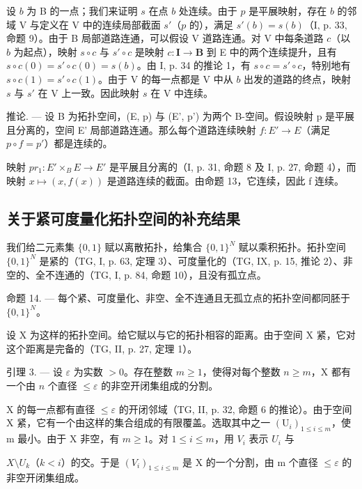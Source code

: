 设 \(b\) 为 B 的一点；我们来证明 \(s\) 在点 \(b\) 处连续。由于 \(p\) 是平展映射，存在 \(b\) 的邻域 V 与定义在 V 中的连续局部截面 \(s'\)（\(p\) 的），满足 \(s'(b) = s(b)\)（I, p. 33, 命题 9）。由于 B 局部道路连通，可以假设 V 道路连通。对 V 中每条道路 \(c\)（以 \(b\) 为起点），映射 \(s \circ c\) 与 \(s' \circ c\) 是映射 \(c \colon \mathbf{I} \to \mathbf{B}\) 到 E 中的两个连续提升，且有 \(s \circ c(0) = s' \circ c(0) = s(b)\)。由 I, p. 34 的推论 1，有 \(s \circ c = s' \circ c\)，特别地有 \(s \circ c(1) = s' \circ c(1)\)。由于 V 的每一点都是 V 中从 \(b\) 出发的道路的终点，映射 \(s\) 与 \(s'\) 在 V 上一致。因此映射 \(s\) 在 V 中连续。

推论. --- 设 B 为拓扑空间，(E, p) 与 (E', p') 为两个 B-空间。假设映射 p 是平展且分离的，空间 E' 局部道路连通。那么每个道路连续映射 \(f: E' \to E\)（满足 \(p \circ f = p'\)）都是连续的。

映射 \(pr_{1}: E'\times_{B} E \rightarrow E'\) 是平展且分离的（I, p. 31, 命题 8 及 I, p. 27, 命题 4），而映射 \(x \mapsto (x, f(x))\) 是道路连续的截面。由命题 13，它连续，因此 f 连续。

\subsection{关于紧可度量化拓扑空间的补充结果}

我们给二元素集 \(\{0,1\}\) 赋以离散拓扑，给集合 \(\{0,1\}^{N}\) 赋以乘积拓扑。拓扑空间 \(\{0,1\}^{N}\) 是紧的（TG, I, p. 63, 定理 3）、可度量化的（TG, IX, p. 15, 推论 2）、非空的、全不连通的（TG, I, p. 84, 命题 10），且没有孤立点。

命题 14. --- 每个紧、可度量化、非空、全不连通且无孤立点的拓扑空间都同胚于 \(\{0,1\}^{N}\)。

设 X 为这样的拓扑空间。给它赋以与它的拓扑相容的距离。由于空间 X 紧，它对这个距离是完备的（TG, II, p. 27, 定理 1）。

引理 3. --- 设 \(\varepsilon\) 为实数 \(>0\)。存在整数 \(m \geqslant 1\)，使得对每个整数 \(n \geqslant m\)，X 都有一个由 \(n\) 个直径 \(\leqslant \varepsilon\) 的非空开闭集组成的分割。

X 的每一点都有直径 \(\leqslant\varepsilon\) 的开闭邻域（TG, II, p. 32, 命题 6 的推论）。由于空间 X 紧，它有一个由这样的集合组成的有限覆盖。选取其中之一 \((\mathrm{U}_{i})_{1\leqslant i\leqslant m}\)，使 m 最小。由于 X 非空，有 \(m\geqslant1\)。对 \(1\leqslant i\leqslant m\)，用 \(V_{i}\) 表示 \(U_{i}\) 与

\(X\setminus U_k\)（\(k < i\)）的交。于是 \((V_i)_{1 \leqslant i \leqslant m}\) 是 X 的一个分割，由 m 个直径 \(\leqslant \varepsilon\) 的非空开闭集组成。

